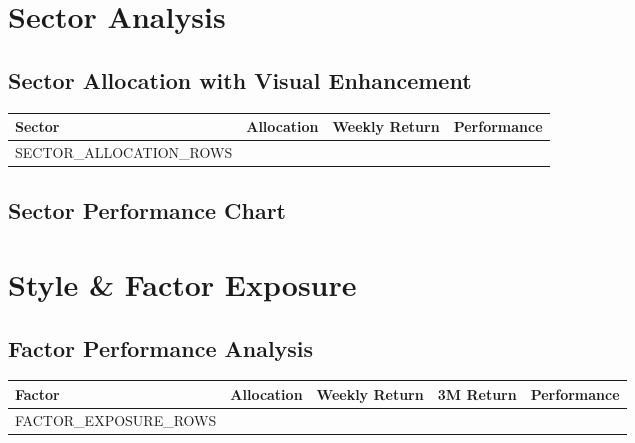 \documentclass[11pt]{article}
\renewcommand{\arraystretch}{1.3}
\begin{document}
\section{Sector Analysis}

\subsection{Sector Allocation with Visual Enhancement}

\renewcommand{\arraystretch}{1.3}

\begin{tabularx}{\textwidth}{|X|c|c|c|}
\hline
\rowcolor{primary!15}
\textbf{Sector} & \textbf{Allocation} & \textbf{Weekly Return} & \textbf{Performance} \\
\hline
{{SECTOR_ALLOCATION_ROWS}}
\hline
\end{tabularx}

\subsection{Sector Performance Chart}

\begin{center}
\end{center}

\section{Style \& Factor Exposure}

\subsection{Factor Performance Analysis}

\renewcommand{\arraystretch}{1.3}
\begin{tabularx}{\textwidth}{|X|c|c|c|c|}
\hline
\rowcolor{secondary!15}
\textbf{Factor} & \textbf{Allocation} & \textbf{Weekly Return} & \textbf{3M Return} & \textbf{Performance} \\
\hline
{{FACTOR_EXPOSURE_ROWS}}
\hline
\end{tabularx}
\end{document}
